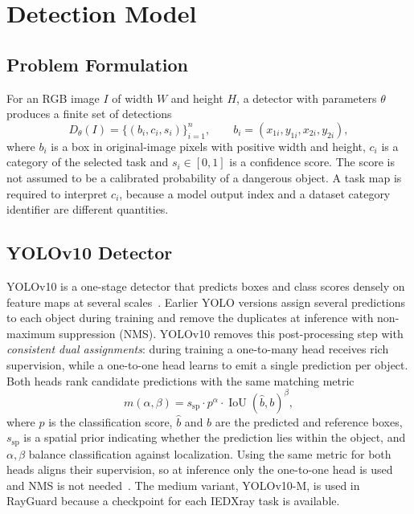 \section{Detection Model}\label{sec:detmodel}

\subsection{Problem Formulation}
For an RGB image $I$ of width $W$ and height $H$, a detector with parameters
$\theta$ produces a finite set of detections
\begin{equation}
 D_\theta(I)=\{(b_i,c_i,s_i)\}_{i=1}^{n},
 \qquad b_i=(x_{1i},y_{1i},x_{2i},y_{2i}),
\end{equation}
where $b_i$ is a box in original-image pixels with positive width and height,
$c_i$ is a category of the selected task and $s_i\in[0,1]$ is a confidence score.
The score is not assumed to be a calibrated probability of a dangerous object.
A task map is required to interpret $c_i$, because a model output index and a
dataset category identifier are different quantities.

\subsection{YOLOv10 Detector}
YOLOv10 is a one-stage detector that predicts boxes and class scores densely on
feature maps at several scales~\citep{wang2024yolov10}. Earlier YOLO versions
assign several predictions to each object during training and remove the
duplicates at inference with non-maximum suppression (NMS). YOLOv10 removes this
post-processing step with \emph{consistent dual assignments}: during training a
one-to-many head receives rich supervision, while a one-to-one head learns to
emit a single prediction per object. Both heads rank candidate predictions with
the same matching metric
\begin{equation}
 m(\alpha,\beta) = s_{\text{sp}} \cdot p^{\alpha} \cdot
 \operatorname{IoU}(\hat b, b)^{\beta},
\end{equation}
where $p$ is the classification score, $\hat b$ and $b$ are the predicted and
reference boxes, $s_{\text{sp}}$ is a spatial prior indicating whether the
prediction lies within the object, and $\alpha,\beta$ balance classification
against localization. Using the same metric for both heads aligns their
supervision, so at inference only the one-to-one head is used and NMS is not
needed~\citep{wang2024yolov10}. The medium variant, YOLOv10-M, is used in
RayGuard because a checkpoint for each IEDXray task is available.

